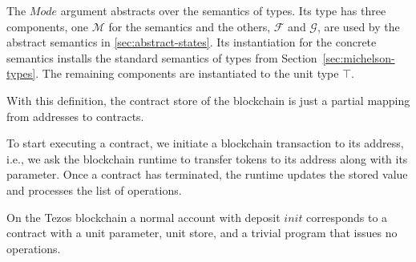 The $Mode$ argument abstracts over the semantics of types. Its type
has three components, one $\mathcal{M}$ for the semantics and the others,
$\mathcal{F}$ and $\mathcal{G}$, are used by the abstract semantics in \autoref{sec:abstract-states}.
\ConcreteMODE
Its instantiation for the concrete semantics installs the 
standard semantics of types from Section~\ref{sec:michelson-types}. The
remaining components are instantiated to the unit type $\top$.
\ConcreteCMode

With this definition, the contract store of the blockchain is just a partial mapping from addresses
to contracts.
\ConcreteBlockchain

To start executing a contract, we initiate a blockchain transaction to its
address, i.e., we ask the blockchain runtime to transfer tokens to its
address along with its parameter.
Once a contract has terminated, the runtime updates the
stored value and processes the list of operations.

On the Tezos blockchain a normal account with deposit $init$
corresponds to a
contract with a unit parameter, unit store, and a trivial program that issues no operations.
\ConcreteAccount



